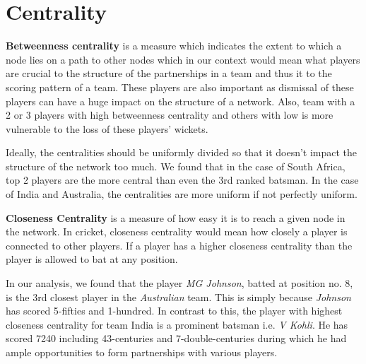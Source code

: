 \documentclass{article}
\begin{document}
\section{Centrality}
\textbf{Betweenness centrality} is a measure which indicates the extent to which a node lies on a path to other nodes which in our context would mean what players are crucial to the structure of the partnerships in a team and thus it to the scoring pattern of a team. These players are also important as dismissal of these players can have a huge impact on the structure of a network. Also, team with a 2 or 3 players with high betweenness centrality and others with low is more vulnerable to the loss of these players' wickets.

Ideally, the centralities should be uniformly divided so that it doesn't impact the structure of the network too much. We found that in the case of South Africa, top 2 players are the more central than even the 3rd ranked batsman. In the case of India and Australia, the centralities are more uniform if not perfectly uniform.

\textbf{Closeness Centrality} is a measure of how easy it is to reach a given node in the network. In cricket, closeness centrality would mean how closely a player is connected to other players. If a player has a higher closeness centrality than the player is allowed to bat at any position. 

In our analysis, we found that the player \textit{MG Johnson}, batted at position no. 8, is the 3rd closest player in the \textit{Australian} team. This is simply because \textit{Johnson} has scored 5-fifties and 1-hundred. In contrast to this, the player with highest closeness centrality for team India is a  prominent batsman i.e. \textit{V Kohli}. He has scored 7240 including 43-centuries and 7-double-centuries during which he had ample opportunities to form partnerships with various players.
\end{document}
